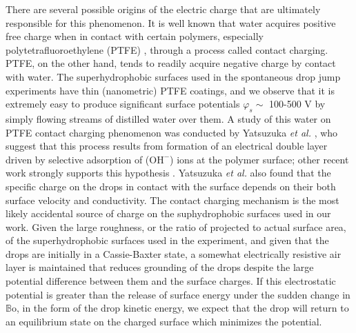 \documentclass[12pt,a4paper,oneside]{book}
\begin{document}
There are several possible origins of the electric charge that are ultimately responsible for this phenomenon. It is well known that water acquires positive free charge when in contact with certain polymers, especially polytetrafluoroethylene (PTFE) \cite{langmuir_surface_1938}, through a process called contact charging. PTFE, on the other hand, tends to readily acquire negative charge by contact with water. The superhydrophobic surfaces used in the spontaneous drop jump experiments have thin (nanometric) PTFE coatings, and we observe that it is extremely easy to produce significant surface potentials $\varphi_s \sim$ 100-500 V by simply flowing streams of distilled water over them. A study of this water on PTFE contact charging phenomenon was conducted by Yatsuzuka \emph{et al.} \cite{yatsuzuka_electrification_1994}, who suggest that this process results from formation of an electrical double layer driven by selective adsorption of ($\mbox{OH}^-$) ions at the polymer surface; other recent work strongly supports this hypothesis \cite{beattie_intrinsic_2006, strazdaite_water_2015}. Yatsuzuka \emph{et al.} also found that the specific charge on the drops in contact with the surface depends on their both surface velocity and conductivity. The contact charging mechanism is the most likely accidental source of charge on the suphydrophobic surfaces used in our work. Given the large roughness, or the ratio of projected to actual surface area, of the superhydrophobic surfaces used in the experiment, and given that the drops are initially in a Cassie-Baxter state, a somewhat electrically resistive air layer is maintained that reduces grounding of the drops despite the large potential difference between them and the surface charges. If this electrostatic potential is greater than the release of surface energy under the sudden change in $\mathbb{B}\mbox{o}$, in the form of the drop kinetic energy, we expect that the drop will return to an equilibrium state on the charged surface which minimizes the potential.
\end{document}
